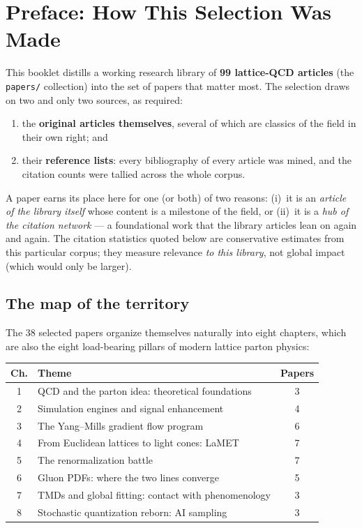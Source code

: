 \chapter*{Preface: How This Selection Was Made}

This booklet distills a working research library of \textbf{99 lattice-QCD
articles} (the \texttt{papers/} collection) into the set of papers that
matter most. The selection draws on two and only two sources, as required:

\begin{enumerate}
  \item the \textbf{original articles themselves}, several of which are
        classics of the field in their own right; and
  \item their \textbf{reference lists}: every bibliography of every article
        was mined, and the citation counts were tallied across the whole
        corpus.
\end{enumerate}

A paper earns its place here for one (or both) of two reasons:
(i)~it is an \emph{article of the library itself} whose content is a
milestone of the field, or (ii)~it is a \emph{hub of the citation network}
--- a foundational work that the library articles lean on again and again.
The citation statistics quoted below are conservative estimates from this
particular corpus; they measure relevance \emph{to this library}, not
global impact (which would only be larger).

\section*{The map of the territory}

The 38 selected papers organize themselves naturally into eight chapters,
which are also the eight load-bearing pillars of modern lattice parton
physics:

\begin{center}
\begin{tabular}{clc}
\toprule
Ch. & Theme & Papers\\
\midrule
1 & QCD and the parton idea: theoretical foundations & 3\\
2 & Simulation engines and signal enhancement & 4\\
3 & The Yang--Mills gradient flow program & 6\\
4 & From Euclidean lattices to light cones: LaMET & 7\\
5 & The renormalization battle & 7\\
6 & Gluon PDFs: where the two lines converge & 5\\
7 & TMDs and global fitting: contact with phenomenology & 3\\
8 & Stochastic quantization reborn: AI sampling & 3\\
\bottomrule
\end{tabular}
\end{center}


